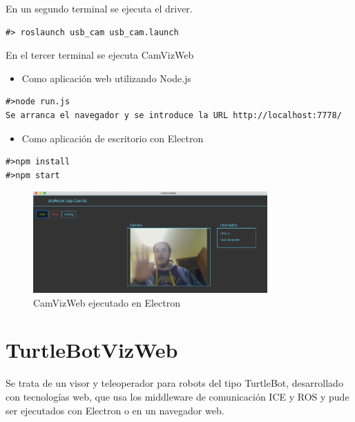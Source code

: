 En un segundo terminal se ejecuta el driver.

\begin{lstlisting}[caption= Ejecución del driver de ROS label=cod.driverusbcam]
#> roslaunch usb_cam usb_cam.launch
\end{lstlisting}

En el tercer terminal se ejecuta CamVizWeb

\begin{itemize}
\item 
Como aplicación web utilizando Node.js
\end{itemize}

\begin{lstlisting}[caption= Ejecución con Node.js, label=cod.camviznodejs]
#>node run.js
Se arranca el navegador y se introduce la URL http://localhost:7778/
\end{lstlisting}

\begin{itemize}
\item 
Como aplicación de escritorio con Electron
\end{itemize}

\begin{lstlisting}[caption= Ejecución con Electron, label=cod.camvizelectron]
#>npm install
#>npm start
\end{lstlisting}

\begin{figure}[H]
  \begin{center}
    \includegraphics[width=0.8\textwidth]{figures/camvizelectron.png}
    		\caption{CamVizWeb ejecutado en Electron}
		\label{fig.camvizelectron}
		\end{center}
\end{figure}

\section{TurtleBotVizWeb}
Se trata de un visor y teleoperador para robots del tipo TurtleBot, desarrollado con tecnologías web, que usa los middleware de comunicación ICE y ROS y pude ser ejecutados con Electron o en un navegador web.

